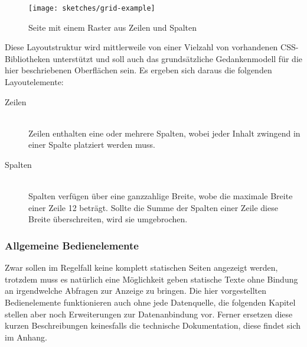 \begin{figure}[p]
  \texttt{[image: sketches/grid-example]}
  \caption{Seite mit einem Raster aus Zeilen und Spalten}
  \label{fig:grid-example}
\end{figure}

Diese Layoutstruktur wird mittlerweile von einer Vielzahl von vorhandenen CSS-Bibliotheken unterstützt und soll auch das grundsätzliche Gedankenmodell für die hier beschriebenen Oberflächen sein. Es ergeben sich daraus die folgenden Layoutelemente:

\begin{description}
\item[Zeilen] \hfill \\
  Zeilen enthalten eine oder mehrere Spalten, wobei jeder Inhalt zwingend in einer Spalte platziert werden muss.
\item[Spalten] \hfill \\
  Spalten verfügen über eine ganzzahlige Breite, wobe die maximale Breite einer Zeile 12 beträgt. Sollte die Summe der Spalten einer Zeile diese Breite überschreiten, wird sie umgebrochen.
\end{description}

\subsubsection{Allgemeine Bedienelemente}

Zwar sollen im Regelfall keine komplett statischen Seiten angezeigt werden, trotzdem muss es natürlich eine Möglichkeit geben statische Texte ohne Bindung an irgendwelche Abfragen zur Anzeige zu bringen. Die hier vorgestellten Bedienelemente funktionieren auch ohne jede Datenquelle, die folgenden Kapitel stellen aber noch Erweiterungen zur Datenanbindung vor. Ferner ersetzen diese kurzen Beschreibungen keinesfalls die technische Dokumentation, diese findet sich im Anhang.

